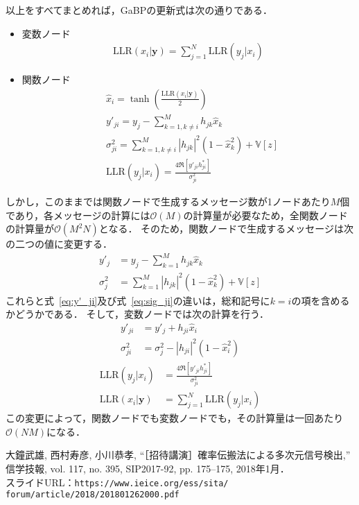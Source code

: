 \documentclass[twocolumn, a4paper]{ieicejsp}
\newcommand{\ABS}[1]{\left|#1\right|}
\newcommand{\BRKTS}[1]{\left[#1\right]}
\begin{document}
以上をすべてまとめれば，GaBPの更新式は次の通りである．
\begin{itemize}
  \item 変数ノード
  \begin{align}
    \mathrm{LLR}(x_i | \mathbf{y}) = \sum_{j=1}^N \mathrm{LLR}(y_j | x_i)
  \end{align}
  \item 関数ノード
  \begin{align}
    &\hat{x}_i = \tanh\left(\frac{\mathrm{LLR}(x_i|\mathbf{y})}{2}\right)\\
    &y'_{ji} = y_j - \sum_{k=1, k\not=i}^{M} h_{jk} \hat{x}_k \label{eq:y'_ji} \\
    &\sigma^2_{ji} = \sum_{k=1,k\not=i}^{M} |h_{jk}|^2 (1- \hat{x}_k^2) + \mathbb{V}[z] \label{eq:sig_ji} \\
    &\mathrm{LLR}(y_j | x_i) = \frac{4\Re\BRKTS{y'_{ji} h_{ji}^{*} }}{\sigma_{ji}^2}
  \end{align}
\end{itemize}
しかし，このままでは関数ノードで生成するメッセージ数が1ノードあたり$M$個であり，各メッセージの計算には$\mathcal{O}(M)$の計算量が必要なため，全関数ノードの計算量が$\mathcal{O}(M^2 N)$となる．
そのため，関数ノードで生成するメッセージは次の二つの値に変更する．
\begin{align}
  y'_{j} &= y_j - \sum_{k=1}^{M} h_{jk} \hat{x}_k \\
  \sigma_{j}^{2} &= \sum_{k=1}^{M} \ABS{h_{jk}}^2 (1 - \hat{x}_k^2) + \mathbb{V}[z]
\end{align}
これらと式~\eqref{eq:y'_ji}及び式~\eqref{eq:sig_ji}の違いは，総和記号に$k=i$の項を含めるかどうかである．
そして，変数ノードでは次の計算を行う．
\begin{align}
  y'_{ji} &= y'_j + h_{ji} \hat{x}_i \\
  \sigma_{ji}^2 &= \sigma_{j}^2 - \ABS{h_{ji}}^2 (1 - \hat{x}_i^2)
\end{align}
\begin{align}
  \mathrm{LLR}(y_j | x_i) &= \frac{4\Re\BRKTS{y'_{ji} h_{ji}^{*} }}{\sigma_{ji}^2} \\
  \mathrm{LLR}(x_i | \mathbf{y}) &= \sum_{j=1}^N \mathrm{LLR}(y_j | x_i)
\end{align}
この変更によって，関数ノードでも変数ノードでも，その計算量は一回あたり$\mathcal{O}(NM)$になる．



\begin{thebibliography}{99}
 大鐘武雄, 西村寿彦, 小川恭孝, ``［招待講演］確率伝搬法による多次元信号検出,'' 信学技報, vol. 117, no. 395, SIP2017-92, pp. 175--175, 2018年1月． \\スライドURL：\verb|https://www.ieice.org/ess/sita/|
\verb|forum/article/2018/201801262000.pdf|

\end{thebibliography}
\end{document}
